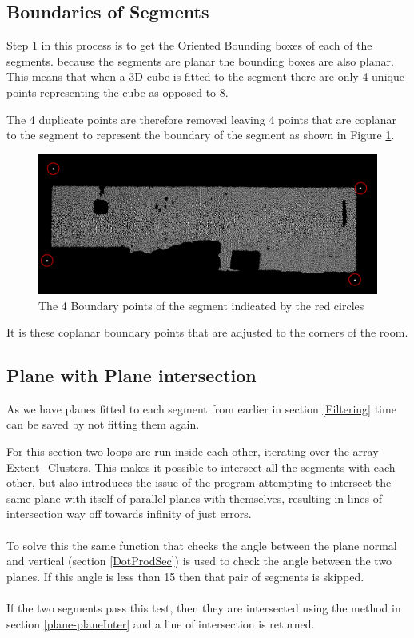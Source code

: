 		\subsection{Boundaries of Segments}
		\label{boundaries}
			Step 1 in this process is to get the Oriented Bounding boxes of each of the segments. because the segments are planar the bounding boxes are also planar. This means that when a 3D cube is fitted to the segment there are only 4 unique points representing the cube as opposed to 8.
			
			The 4 duplicate points are therefore removed leaving 4 points that are coplanar to the segment to represent the boundary of the segment as shown in Figure \ref{fig:BOundingBox}.
		
			\begin{figure}[H]
				\centering
				\includegraphics[width=1\linewidth]{"Includes/images/Bounding Box/BOunding Box"}
				\caption{The 4 Boundary points of the segment indicated by the red circles}
				\label{fig:BOundingBox}
			\end{figure}
			
			It is these coplanar boundary points that are adjusted to the corners of the room.
			
		\subsection{Plane with Plane intersection}
		\label{planeInterResults}
			As we have planes fitted to each segment from earlier in section \ref{Filtering} time can be saved by not fitting them again.
			
			For this section two loops are run inside each other, iterating over the array Extent\_Clusters. This makes it possible to intersect all the segments with each other, but also introduces the issue of the program attempting to intersect the same plane with itself of parallel planes with themselves, resulting in lines of intersection way off towards infinity of just errors.\\
			\\
			To solve this the same function that checks the angle between the plane normal and vertical (section \ref{DotProdSec}) is used to check the angle between the two planes. If this angle is less than 15\textdegree\: then that pair of segments is skipped.\\
			\\
			If the two segments pass this test, then they are intersected using the method in section \ref{plane-planeInter} and a line of intersection is returned.
			
